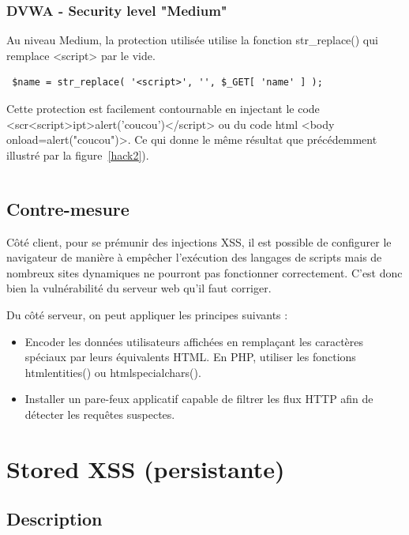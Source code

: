 \subsubsection{DVWA - Security level "Medium"}
Au niveau Medium, la protection utilisée utilise la fonction  str\_replace()
qui remplace <script> par le vide.  
\begin{verbatim}
 $name = str_replace( '<script>', '', $_GET[ 'name' ] ); 
\end{verbatim}
Cette protection est facilement contournable en injectant le code
<scr<script>ipt>alert('coucou')</script> ou du code html <body onload=alert("coucou")>. Ce qui donne le même résultat
que précédemment illustré par la figure~\ref{hack2}). 


\begin{verbatim}

\end{verbatim}

\subsection{Contre-mesure}

Côté client, pour se prémunir des injections XSS, il est possible de configurer le navigateur de manière à empêcher l'exécution des langages de scripts mais de nombreux sites dynamiques ne pourront pas fonctionner correctement. C'est donc bien la vulnérabilité du serveur web qu'il faut corriger.
{
Du côté serveur, on peut appliquer les principes suivants :
\begin{itemize}[font=\color{magenta} \Large, label=]
	\item Encoder les données utilisateurs affichées en remplaçant les caractères spéciaux par leurs équivalents HTML. En PHP, utiliser les fonctions htmlentities() ou htmlspecialchars().​ 
	\item Installer un pare-feux applicatif capable de filtrer les flux HTTP afin de détecter les requêtes suspectes.

\end{itemize}

}

\newpage
\section{Stored XSS (persistante)  }




\subsection{Description}

